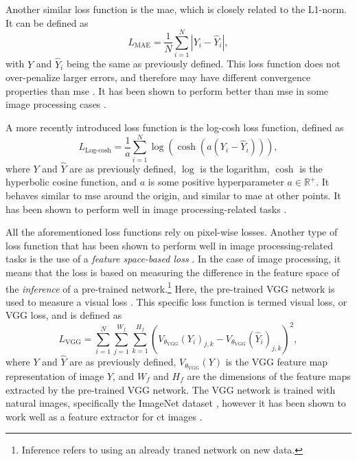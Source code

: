 Another similar loss function is the \gls{mae}, which is closely related to the L1-norm. It can be defined as
\begin{equation}
    \label{eq:lossmae}
    L_{\text{MAE}} = \frac{1}{N} \sum_{i=1}^N |Y_i - \hat{Y}_i|,
\end{equation}
with $Y$ and $\hat{Y}_i$ being the same as previously defined. This loss function does not over-penalize larger errors, and therefore may have different convergence properties than \gls{mse} \cite{7797130}. It has been shown to perform better than \gls{mse} in some image processing cases \cite{7797130,10.1002/mp.13713}. 

A more recently introduced loss function is the log-cosh loss function, defined as \cite{chen2019log}
\begin{equation}
    \label{eq:losslogcosh}
    L_{\text{Log-cosh}} = \frac{1}{a} \sum_{i=1}^N \log ( \cosh ( a ( Y_i - \hat{Y}_i))),
\end{equation}
where $Y$ and $\hat{Y}$ are as previously defined, $\log$ is the logarithm, $\cosh$ is the hyperbolic cosine function, and $a$ is some positive hyperparameter $a \in \mathbb{R}^+$. It behaves similar to \gls{mse} around the origin, and similar to \gls{mae} at other points. It has been shown to perform well in image processing-related tasks \cite{7797130}.

All the aforementioned loss functions rely on pixel-wise losses. Another type of loss function that has been shown to perform well in image processing-related tasks is the use of a \textit{feature space-based loss} \cite{vggloss}. In the case of image processing, it means that the loss is based on measuring the difference in the feature space of the \textit{inference} of a pre-trained network.\footnote{Inference refers to using an already traned network on new data. } Here, the pre-trained VGG network is used to measure a visual loss \cite{simonyan2015deep}. This specific loss function is termed visual loss, or VGG loss, and is defined as \cite{vggloss,liu2020tomogan}
\begin{equation}
    \label{eq:lossvgg}
    L_{\text{VGG}} = \sum_{i=1}^{N} \sum_{j=1}^{W_f} \sum_{k=1}^{H_f} \left(V_{\theta_{\text{VGG}}} (Y_i)_{j,k} - V_{\theta_{\text{VGG}}} (\hat{Y}_i)_{j,k} \right)^2,
\end{equation}
where $Y$ and $\hat{Y}$ are as previously defined, $V_{\theta_{\text{VGG}}}(Y)$ is the VGG feature map representation of image $Y$, and $W_f$ and $H_f$ are the dimensions of the feature maps extracted by the pre-trained VGG network. The VGG network is trained with natural images, specifically the ImageNet dataset \cite{deng2009imagenet}, however it has been shown to work well as a feature extractor for \gls{ct} images \cite{8340157}. 

